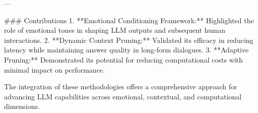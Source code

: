 ---

### Contributions  
1. **Emotional Conditioning Framework:** Highlighted the role of emotional tones in shaping LLM outputs and subsequent human interactions.  
2. **Dynamic Context Pruning:** Validated its efficacy in reducing latency while maintaining answer quality in long-form dialogues.  
3. **Adaptive Pruning:** Demonstrated its potential for reducing computational costs with minimal impact on performance.  

The integration of these methodologies offers a comprehensive approach for advancing LLM capabilities across emotional, contextual, and computational dimensions.